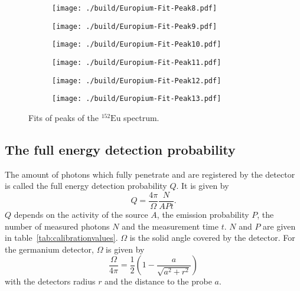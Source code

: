 \begin{figure}[H]
	\begin{adjustbox}{width=1.3\textwidth, center}
		\begin{subfigure}{.5\textwidth}
			\centering
			\texttt{[image: ./build/Europium-Fit-Peak8.pdf]}
		\end{subfigure}%
		\begin{subfigure}{.5\textwidth}
			\centering
			\texttt{[image: ./build/Europium-Fit-Peak9.pdf]}
		\end{subfigure}
	\end{adjustbox}
	\begin{adjustbox}{width=1.3\textwidth, center}
		\begin{subfigure}{.5\textwidth}
			\centering
			\texttt{[image: ./build/Europium-Fit-Peak10.pdf]}
		\end{subfigure}%
		\begin{subfigure}{.5\textwidth}
			\centering
			\texttt{[image: ./build/Europium-Fit-Peak11.pdf]}
		\end{subfigure}
	\end{adjustbox}
	\begin{adjustbox}{width=1.3\textwidth, center}
		\begin{subfigure}{.5\textwidth}
			\centering
			\texttt{[image: ./build/Europium-Fit-Peak12.pdf]}
		\end{subfigure}%
		\begin{subfigure}{.5\textwidth}
			\centering
			\texttt{[image: ./build/Europium-Fit-Peak13.pdf]}
		\end{subfigure}
	\end{adjustbox}
	\caption{Fits of peaks of the $^{152}\text{Eu}$ spectrum.}
\end{figure}


\subsection{The full energy detection probability}
The amount of photons which fully penetrate and are registered by the detector is called the full energy
detection probability $Q$. It is given by
\begin{equation}
	Q = \frac{4 \pi}{\Omega}\frac{N}{APt}.
	\label{eqn:fullenergy}
\end{equation}
$Q$ depends on the activity of the source $A$, the emission probability $P$, the number of measured photons $N$ and
the measurement time $t$. $N$ and $P$ are given in
table~\ref{tab:calibrationvalues}. $\Omega$ is the solid angle covered by the
detector. For the germanium detector, $\Omega$ is given by
\begin{equation}
	\frac{\Omega}{4 \pi} = \frac{1}{2} \left( 1 - \frac{a}{\sqrt{a^{2} + r^{2}}} \right)
	\label{eqn:solidangle}
\end{equation}
with the detectors radius $r$ and the distance to the probe $a$.

